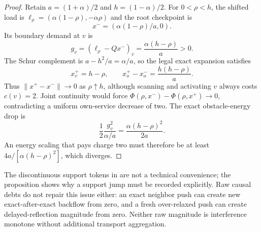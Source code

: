 \begin{proof}
Retain $a=(1+\alpha)/2$ and $h=(1-\alpha)/2$.  For $0<\rho<h$, the shifted
load is $\ell_\rho=(\alpha(1-\rho),-\alpha\rho)$ and the root checkpoint is
\[
 x^-=(\alpha(1-\rho)/a,0).
\]
Its boundary demand at $v$ is
\[
 g_v=(\ell_\rho-Qx^-)_v=\frac{\alpha(h-\rho)}a>0.
\]
The Schur complement is $a-h^2/a=\alpha/a$, so the legal exact expansion
satisfies
\begin{equation}
 x_v^+=h-\rho,
 \qquad
 x_o^+-x_o^-=\frac{h(h-\rho)}a.
 \label{eq:vanishing-activation-jump}
\end{equation}
Thus $\|x^+-x^-\|\to0$ as $\rho\uparrow h$, although scanning and activating
$v$ always costs $c(v)=2$.  Joint continuity would force
$\Phi(\rho,x^-)-\Phi(\rho,x^+)\to0$, contradicting a uniform own-service
decrease of two.  The exact obstacle-energy drop is
\[
 \frac12\frac{g_v^2}{\alpha/a}
 =\frac{\alpha(h-\rho)^2}{2a}.
\]
An energy scaling that pays charge two must therefore be at least
$4a/[\alpha(h-\rho)^2]$, which diverges.
\end{proof}

The discontinuous support tokens in
 are not a
technical convenience; the proposition shows why a support jump must be
recorded explicitly.  Raw causal debts do not repair this issue either: an
exact neighbor push can create new exact-after-exact backflow from zero, and
a fresh over-relaxed push can create delayed-reflection magnitude from zero.
Neither raw magnitude is interference monotone without additional transport
aggregation.
